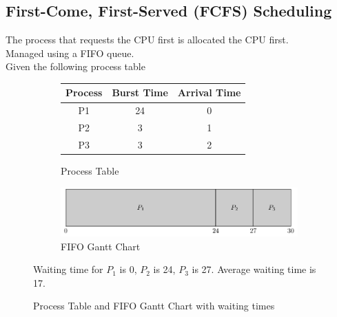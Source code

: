 \documentclass[oneside]{book}
\begin{document}
            \subsection{First-Come, First-Served (FCFS) Scheduling}
                The process that requests the CPU first is allocated the CPU first.\\
                Managed using a FIFO queue.\\
                Given the following process table
                \begin{figure}[H]
                    \centering
                    \begin{subfigure}{0.5\textwidth}
                        \centering
                        \begin{tabular}{ccc}
                            Process & Burst Time & Arrival Time\\
                            \toprule
                            P1 & 24 & 0\\
                            P2 & 3  & 1\\
                            P3 & 3  & 2\\
                            \bottomrule
                        \end{tabular}
                        \caption{Process Table}
                    \end{subfigure}%
                    \begin{subfigure}{0.5\textwidth}
                        \centering
                        \includegraphics[width=\linewidth]{figures/fifo_gantt_1.pdf}
                        \caption{FIFO Gantt Chart}
                    \end{subfigure}
                    Waiting time for $P_1$ is 0, $P_2$ is 24, $P_3$ is 27. Average waiting time is 17.
                    \caption{Process Table and FIFO Gantt Chart with waiting times}
                \end{figure}
\end{document}
